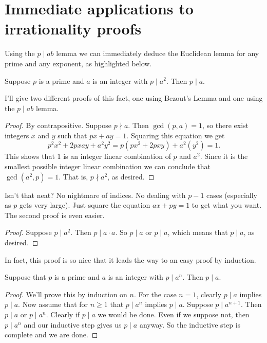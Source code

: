 \section{Immediate applications to irrationality proofs}

Using the $p \mid ab$ lemma we can immediately deduce the Euclidean lemma for any prime and any exponent, as highlighted below.

\begin{lemma}
Suppose $p$ is a prime and $a$ is an integer with $p \mid a^2$. Then $p \mid a$.
\end{lemma}
I'll give two different proofs of this fact, one using Bezout's Lemma and one using the $p \mid ab$ lemma.
\begin{proof}
    By contrapositive. Suppose $p \nmid a$. Then $\gcd(p, a) = 1$, so there exist integers $x$ and $y$ such that $px + ay = 1$. Squaring this equation we get 
    \[p^2x^2 + 2pxay + a^2y^2 = p(px^2 + 2pxy) + a^2(y^2) = 1.\]
    This shows that $1$ is an integer linear combination of $p$ and $a^2$. Since it is the smallest possible integer linear combination we can conclude that $\gcd(a^2, p) = 1$. That is,
    $p \nmid a^2$, as desired.
\end{proof}
Isn't that neat? No nightmare of indices. No dealing with $p-1$ cases (especially as $p$ gets very large). Just square the equation $ax + py = 1$ to get what you want. The second proof is even easier.

\begin{proof}
    Suppose $p \mid a^2$. Then $p \mid a \cdot a$. So $p \mid a$ or $p \mid a$, which means that $p \mid a$, as desired.
\end{proof}

In fact, this proof is so nice that it leads the way to an easy proof by induction.

\begin{lemma} \label{gen_euclid}
Suppose that $p$ is a prime and $a$ is an integer with $p \mid a^n$. Then $p \mid a$.
\end{lemma}

\begin{proof}
We'll prove this by induction on $n$. For the case $n = 1$, clearly $p \mid a$ implies $p \mid a$. Now assume that for $n \geq 1$ that $p \mid a^n$ implies $p \mid a$. Suppose $p \mid a^{n + 1}$. Then $p \mid a$ or $p \mid a^n$. Clearly if $p \mid a$ we would be done. Even if we suppose not, then $p \mid a^n$ and our inductive step gives us $p \mid a$ anyway. So the inductive step is complete and we are done.
\end{proof}

